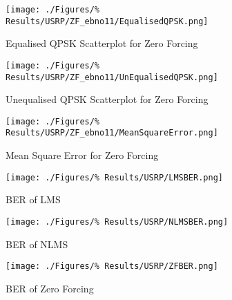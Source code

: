 \begin{figure}[ht]
	\centering
	\begin{minipage}{0.49\textwidth}
		\centering
		\texttt{[image: ./Figures/\%
		Results/USRP/ZF\_ebno11/EqualisedQPSK.png]}
		\captionsetup{width=0.75\linewidth}
		\caption{Equalised QPSK Scatterplot for Zero 
		Forcing}
	\end{minipage}
	\begin{minipage}{0.49\textwidth}
		\centering
		\texttt{[image: ./Figures/\%
		Results/USRP/ZF\_ebno11/UnEqualisedQPSK.png]}
		\captionsetup{width=0.75\linewidth}
		\caption{Unequalised QPSK Scatterplot for Zero 
		Forcing}
	\end{minipage}
\end{figure}
\begin{figure}[ht]
	\centering
	\texttt{[image: ./Figures/\%
	Results/USRP/ZF\_ebno11/MeanSquareError.png]}
	\captionsetup{width=0.75\linewidth}
	\caption{Mean Square Error for Zero Forcing}
\end{figure}

\begin{figure}[ht]
	\centering
	\begin{minipage}{0.49\textwidth}
		\centering
		\texttt{[image: ./Figures/\%
		Results/USRP/LMSBER.png]}
		\captionsetup{width=0.75\linewidth}
		\caption{BER of LMS}
	\end{minipage}
	\begin{minipage}{0.49\textwidth}
		\centering
		\texttt{[image: ./Figures/\%
		Results/USRP/NLMSBER.png]}
		\captionsetup{width=0.75\linewidth}
		\caption{BER of NLMS}
		\label{fig:NLMS-BER-USRP}
	\end{minipage}
\end{figure}
\begin{figure}[ht]
	\centering
	\texttt{[image: ./Figures/\%
	Results/USRP/ZFBER.png]}
	\captionsetup{width=0.75\linewidth}
	\caption{BER of Zero Forcing}
\end{figure}
